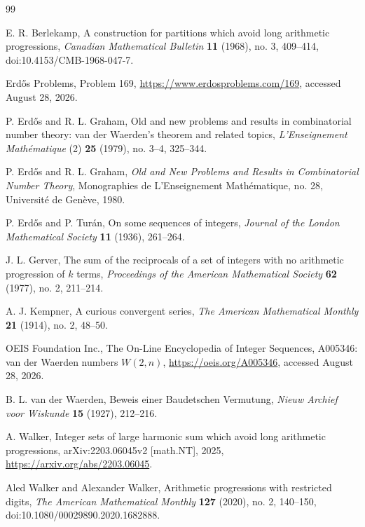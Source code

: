 \documentclass[11pt]{article}
\theoremstyle{definition}
\theoremstyle{remark}
\begin{document}
\begin{thebibliography}{99}
\small

E. R. Berlekamp,
\newblock A construction for partitions which avoid long arithmetic progressions,
\newblock \emph{Canadian Mathematical Bulletin} \textbf{11} (1968), no. 3,
409--414, doi:10.4153/CMB-1968-047-7.

Erd\H{o}s Problems,
\newblock Problem 169,
\newblock \url{https://www.erdosproblems.com/169}, accessed August 28, 2026.

P. Erd\H{o}s and R. L. Graham,
\newblock Old and new problems and results in combinatorial number theory:
van der Waerden's theorem and related topics,
\newblock \emph{L'Enseignement Math\'ematique} (2) \textbf{25} (1979), no. 3--4,
325--344.

P. Erd\H{o}s and R. L. Graham,
\newblock \emph{Old and New Problems and Results in Combinatorial Number Theory},
\newblock Monographies de L'Enseignement Math\'ematique, no. 28,
Universit\'e de Gen\`eve, 1980.

P. Erd\H{o}s and P. Tur\'an,
\newblock On some sequences of integers,
\newblock \emph{Journal of the London Mathematical Society} \textbf{11} (1936),
261--264.

J. L. Gerver,
\newblock The sum of the reciprocals of a set of integers with no arithmetic
progression of $k$ terms,
\newblock \emph{Proceedings of the American Mathematical Society}
\textbf{62} (1977), no. 2, 211--214.

A. J. Kempner,
\newblock A curious convergent series,
\newblock \emph{The American Mathematical Monthly} \textbf{21} (1914), no. 2,
48--50.

OEIS Foundation Inc.,
\newblock The On-Line Encyclopedia of Integer Sequences, A005346:
van der Waerden numbers $W(2,n)$,
\newblock \url{https://oeis.org/A005346}, accessed August 28, 2026.

B. L. van der Waerden,
\newblock Beweis einer Baudetschen Vermutung,
\newblock \emph{Nieuw Archief voor Wiskunde} \textbf{15} (1927), 212--216.

A. Walker,
\newblock Integer sets of large harmonic sum which avoid long arithmetic
progressions,
\newblock arXiv:2203.06045v2 [math.NT], 2025,
\newblock \url{https://arxiv.org/abs/2203.06045}.

Aled Walker and Alexander Walker,
\newblock Arithmetic progressions with restricted digits,
\newblock \emph{The American Mathematical Monthly} \textbf{127} (2020), no. 2,
140--150, doi:10.1080/00029890.2020.1682888.

\end{thebibliography}
\end{document}
